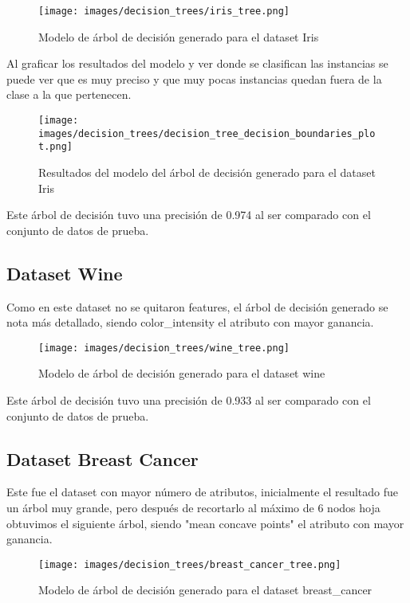 \documentclass[sigconf,authorversion,nonacm]{acmart}
\begin{document}
\begin{figure}[H]
  \centering
  \texttt{[image: images/decision\_trees/iris\_tree.png]}
  \caption{Modelo de árbol de decisión generado para el dataset Iris}
\end{figure}

Al graficar los resultados del modelo y ver donde se clasifican las instancias se puede ver que es muy preciso y que muy pocas instancias quedan fuera de la clase a la que pertenecen.

\begin{figure}[H]
  \centering
  \texttt{[image: images/decision\_trees/decision\_tree\_decision\_boundaries\_plot.png]}
  \caption{Resultados del modelo del árbol de decisión generado para el dataset Iris}
\end{figure}

Este árbol de decisión tuvo una precisión de 0.974 al ser comparado con el conjunto de datos de prueba.

\subsection{Dataset Wine}
Como en este dataset no se quitaron features, el árbol de decisión generado se nota más detallado, siendo color\_intensity el atributo con mayor ganancia.

\begin{figure}[H]
  \centering
  \texttt{[image: images/decision\_trees/wine\_tree.png]}
  \caption{Modelo de árbol de decisión generado para el dataset wine}
\end{figure}

Este árbol de decisión tuvo una precisión de 0.933 al ser comparado con el conjunto de datos de prueba.

\subsection{Dataset Breast Cancer}
Este fue el dataset con mayor número de atributos, inicialmente el resultado fue un árbol muy grande, pero después de recortarlo al máximo de 6 nodos hoja obtuvimos el siguiente árbol, siendo "mean concave points" el atributo con mayor ganancia.

\begin{figure}[H]
  \centering
  \texttt{[image: images/decision\_trees/breast\_cancer\_tree.png]}
  \caption{Modelo de árbol de decisión generado para el dataset breast\_cancer}
\end{figure}
\end{document}
